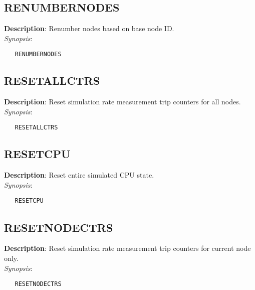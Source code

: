 \subsection{\bf RENUMBERNODES}
\label{manpages:RENUMBERNODES}
\label{manpages:renumbernodes}
\vspace{-0.2in}
{\bf Description}: 	Renumber nodes based on base node ID.\\[1.5ex]
{\em Synopsis}:
\vspace{-0.2in}
\scriptsize
\begin{verbatim}
   RENUMBERNODES   				
\end{verbatim}
\normalsize
\vspace{-0.2in}


\subsection{\bf RESETALLCTRS}
\label{manpages:RESETALLCTRS}
\label{manpages:resetallctrs}
\vspace{-0.2in}
{\bf Description}: 	Reset simulation rate measurement trip counters for all nodes.\\[1.5ex]
{\em Synopsis}:
\vspace{-0.2in}
\scriptsize
\begin{verbatim}
   RESETALLCTRS   				
\end{verbatim}
\normalsize
\vspace{-0.2in}


\subsection{\bf RESETCPU}
\label{manpages:RESETCPU}
\label{manpages:resetcpu}
\vspace{-0.2in}
{\bf Description}: 	Reset entire simulated CPU state.\\[1.5ex]
{\em Synopsis}:
\vspace{-0.2in}
\scriptsize
\begin{verbatim}
   RESETCPU   					
\end{verbatim}
\normalsize
\vspace{-0.2in}


\subsection{\bf RESETNODECTRS}
\label{manpages:RESETNODECTRS}
\label{manpages:resetnodectrs}
\vspace{-0.2in}
{\bf Description}: 	Reset simulation rate measurement trip counters for current node only.\\[1.5ex]
{\em Synopsis}:
\vspace{-0.2in}
\scriptsize
\begin{verbatim}
   RESETNODECTRS   				
\end{verbatim}
\normalsize
\vspace{-0.2in}


